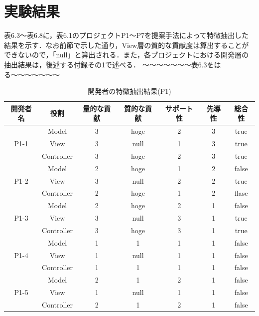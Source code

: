 \documentclass{funthesis}
\begin{document}
\section{実験結果}
表6.3〜表6.8に，表6.1のプロジェクトP1〜P7を提案手法によって特徴抽出した結果を示す．なお前節で示した通り，View層の質的な貢献度は算出することができないので，「null」と算出される．また，各プロジェクトにおける開発層の抽出結果は，後述する付録その1で述べる．
〜〜〜〜〜〜〜表6.3をはる〜〜〜〜〜〜〜
\begin{table}[htb]
  \begin{center}
\begin{tabular}{|c|c|c|c|c|c|c|}
\hline
開発者名 & 役割 & 量的な貢献 & 質的な貢献 & サポート性 & 先導性 & 総合性\\ \hline
& Model & 3 & hoge & 2 & 3 & true\\ \cline{2-7}
P1-1 & View & 3 & null & 1 & 3 & true\\ \cline{2-7}
& Controller & 3 & hoge & 2 & 3 & true \\ \hline \hline
& Model & 2 & hoge & 1 & 2 & false\\ \cline{2-7}
P1-2 & View & 3 & null & 2 & 2 & true\\ \cline{2-7}
& Controller & 2 & hoge & 1 & 2 & flase \\ \hline \hline
& Model & 2 & hoge & 2 & 1 & false\\ \cline{2-7}
P1-3 & View & 3 & null & 3 & 1 & true\\ \cline{2-7}
& Controller & 3 & hoge & 3 & 1 & true \\ \hline \hline
& Model & 1 & 1 & 1 & 1 & false\\ \cline{2-7}
P1-4 & View & 1 & null & 1 & 1 & false\\ \cline{2-7}
& Controller & 1 & 1 & 1 & 1 & false \\ \hline \hline
& Model & 2 & 1 & 2 & 1 & false\\ \cline{2-7}
P1-5 & View & 1 & null & 1 & 1 & false\\ \cline{2-7}
& Controller & 2 & 1 & 2 & 1 & false \\ \hline
\end{tabular}
  \end{center}
  \caption{開発者の特徴抽出結果(P1)}    \label{sample}
\end{table}
\end{document}

